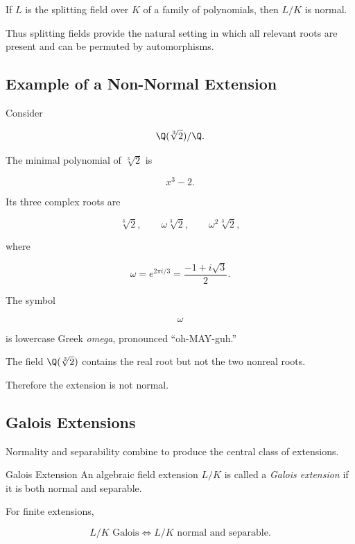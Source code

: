 If \(L\) is the splitting field over \(K\) of a family of polynomials, then
\(L/K\) is normal.

Thus splitting fields provide the natural setting in which all relevant roots
are present and can be permuted by automorphisms.

\subsection{Example of a Non-Normal Extension}
\label{subsec:non-normal-extension}

Consider

\[ \Q(\sqrt[3]{2})/\Q. \]

The minimal polynomial of \(\sqrt[3]{2}\) is

\[ x^3-2. \]

Its three complex roots are

\[ \sqrt[3]{2},\qquad \omega\sqrt[3]{2},\qquad\omega^2\sqrt[3]{2}, \]

where

\[ \omega=e^{2\pi i/3}=\frac{-1+i\sqrt3}{2}. \]

The symbol

\[ \omega \]

is lowercase Greek \emph{omega}, pronounced ``oh-MAY-guh.''

The field \(\Q(\sqrt[3]{2})\) contains the real root but not the two nonreal
roots.

Therefore the extension is not normal.

\subsection{Galois Extensions}
\label{subsec:galois-extensions}

Normality and separability combine to produce the central class of
extensions.

\begin{definitionbox}{Galois Extension}
An algebraic field extension \(L/K\) is called a \emph{Galois extension} if
it is both normal and separable.
\end{definitionbox}

For finite extensions,

\[ \boxed{L/K\text{ Galois}\iff L/K\text{ normal and separable}.} \]

